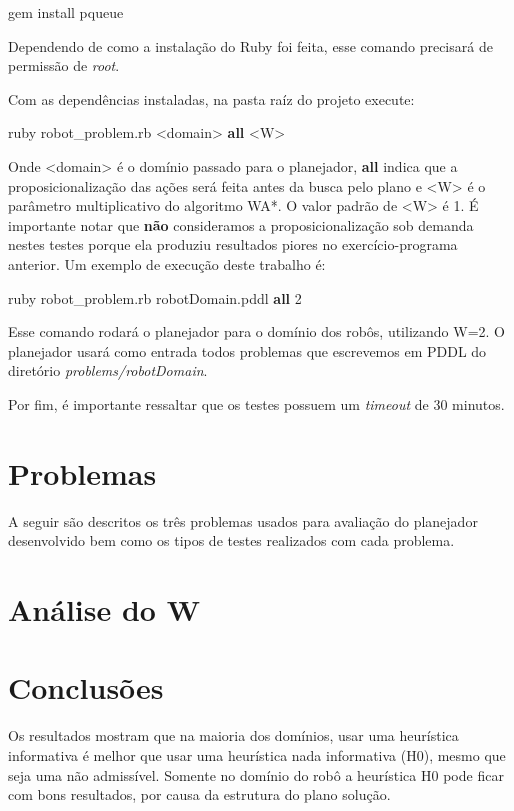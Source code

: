 \documentclass[12pt,a4paper]{article}
\begin{document}
\begin{center}{gem install pqueue}\end{center}

Dependendo de como a instalação do Ruby foi feita, esse comando precisará de permissão de \textit{root}.

Com as dependências instaladas, na pasta raíz do projeto execute:

\begin{center}{ruby robot\_problem.rb <domain> \textbf{all} <W>}\end{center}

Onde <domain> é o domínio passado para o planejador, \textbf{all} indica que a proposicionalização das ações será feita antes da busca pelo plano e <W> é o parâmetro multiplicativo do algoritmo WA*. O valor padrão de <W> é 1.
É importante notar que \textbf{não} consideramos a proposicionalização sob demanda nestes testes porque ela produziu resultados piores no exercício-programa anterior. Um exemplo de execução deste trabalho é:

\begin{center}{ruby robot\_problem.rb robotDomain.pddl \textbf{all} 2}\end{center}

Esse comando rodará o planejador para o domínio dos robôs, utilizando W=2. O planejador usará como entrada todos problemas que escrevemos em PDDL do diretório \textit{problems/robotDomain}.

Por fim, é importante ressaltar que os testes possuem um \textit{timeout} de 30 minutos.


\section{Problemas}\label{problemas}

A seguir são descritos os três problemas usados para avaliação do planejador desenvolvido bem como os tipos de testes realizados com cada problema.




\section{Análise do W}\label{analise}




\section{Conclusões}\label{conclusao}
Os resultados mostram que na maioria dos domínios, usar uma heurística informativa é melhor que usar uma heurística nada informativa (H0), mesmo que seja uma não admissível. 
Somente no domínio do robô a heurística H0 pode ficar com bons resultados, por causa da estrutura do plano solução.
\end{document}
